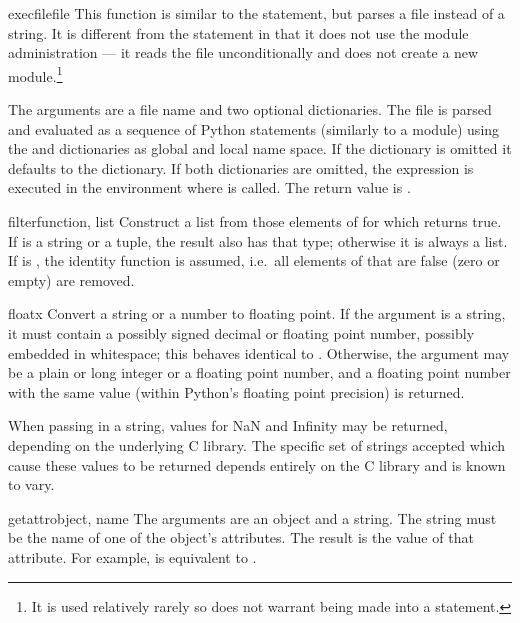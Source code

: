 \begin{funcdesc}{execfile}{file}
  This function is similar to the
   statement, but parses a file instead of a string.  It
  is different from the  statement in that it does not
  use the module administration --- it reads the file unconditionally
  and does not create a new module.\footnote{It is used relatively
  rarely so does not warrant being made into a statement.}

  The arguments are a file name and two optional dictionaries.  The
  file is parsed and evaluated as a sequence of Python statements
  (similarly to a module) using the  and 
  dictionaries as global and local name space.  If the 
  dictionary is omitted it defaults to the  dictionary.
  If both dictionaries are omitted, the expression is executed in the
  environment where  is called.  The return value is
  .
\end{funcdesc}

\begin{funcdesc}{filter}{function, list}
Construct a list from those elements of  for which
 returns true.  If  is a string or a tuple,
the result also has that type; otherwise it is always a list.  If
 is , the identity function is assumed,
i.e.\ all elements of  that are false (zero or empty) are
removed.
\end{funcdesc}

\begin{funcdesc}{float}{x}
  Convert a string or a number to floating point.  If the argument is a
  string, it must contain a possibly signed decimal or floating point
  number, possibly embedded in whitespace; this behaves identical to
  .  Otherwise, the argument may be a plain
  or long integer or a floating point number, and a floating point
  number with the same value (within Python's floating point
  precision) is returned.

   When passing in a string, values for NaN
  and Infinity may be returned, depending on the
  underlying C library.  The specific set of strings accepted which
  cause these values to be returned depends entirely on the C library
  and is known to vary.
\end{funcdesc}

\begin{funcdesc}{getattr}{object, name}
  The arguments are an object and a string.  The string must be the
  name of one of the object's attributes.  The result is the value of
  that attribute.  For example,  is equivalent to .
\end{funcdesc}


